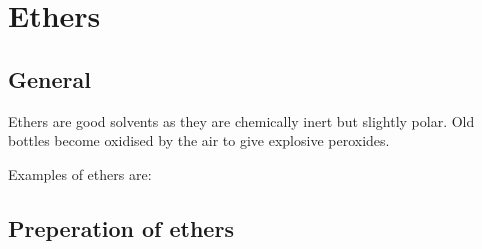 \section{Ethers}

\subsection{General}

Ethers are good solvents as they are chemically inert but slightly polar. Old
bottles become oxidised by the air to give explosive peroxides.

Examples of ethers are:


\subsection{Preperation of ethers}
